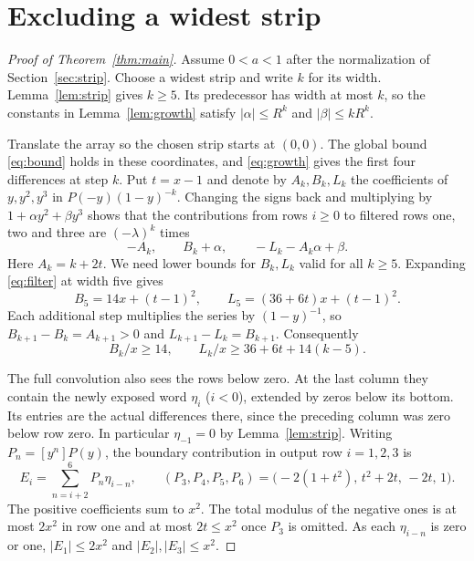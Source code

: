 \documentclass[11pt,reqno]{amsart}
\begin{document}
\section{Excluding a widest strip}\label{sec:end}
\begin{proof}[Proof of Theorem~\ref{thm:main}]
Assume \(0<a<1\) after the normalization of Section~\ref{sec:strip}. Choose a widest strip and write \(k\) for its width. Lemma~\ref{lem:strip} gives \(k\ge5\). Its predecessor has width at most \(k\), so the constants in Lemma~\ref{lem:growth} satisfy \(|\alpha|\le R^k\) and \(|\beta|\le kR^k\).

Translate the array so the chosen strip starts at \((0,0)\). The global bound \eqref{eq:bound} holds in these coordinates, and \eqref{eq:growth} gives the first four differences at step \(k\). Put \(t=x-1\) and denote by \(A_k,B_k,L_k\) the coefficients of \(y,y^2,y^3\) in \(P(-y)(1-y)^{-k}\). Changing the signs back and multiplying by \(1+\alpha y^2+\beta y^3\) shows that the contributions from rows \(i\ge0\) to filtered rows one, two and three are \((-\lambda)^k\) times
\begin{equation}\label{eq:responses}
 -A_k,\qquad B_k+\alpha,\qquad -L_k-A_k\alpha+\beta .
\end{equation}
Here \(A_k=k+2t\). We need lower bounds for \(B_k,L_k\) valid for all \(k\ge5\). Expanding \eqref{eq:filter} at width five gives
\[
 B_5=14x+(t-1)^2,\qquad L_5=(36+6t)x+(t-1)^2 .
\]
Each additional step multiplies the series by \((1-y)^{-1}\), so \(B_{k+1}-B_k=A_{k+1}>0\) and \(L_{k+1}-L_k=B_{k+1}\). Consequently
\begin{equation}\label{eq:lower}
 B_k/x\ge14,\qquad L_k/x\ge36+6t+14(k-5).
\end{equation}

The full convolution also sees the rows below zero. At the last column they contain the newly exposed word \(\eta_i\) (\(i<0\)), extended by zeros below its bottom. Its entries are the actual differences there, since the preceding column was zero below row zero. In particular \(\eta_{-1}=0\) by Lemma~\ref{lem:strip}. Writing \(P_n=[y^n]P(y)\), the boundary contribution in output row \(i=1,2,3\) is
\[
 E_i=\sum_{n=i+2}^6P_n\eta_{i-n},\qquad
 (P_3,P_4,P_5,P_6)=\big(-2(1+t^2),\,t^2+2t,\,-2t,\,1\big).
\]
The positive coefficients sum to \(x^2\). The total modulus of the negative ones is at most \(2x^2\) in row one and at most \(2t\le x^2\) once \(P_3\) is omitted. As each \(\eta_{i-n}\) is zero or one, \(|E_1|\le2x^2\) and \(|E_2|,|E_3|\le x^2\).


\end{proof}
\end{document}
